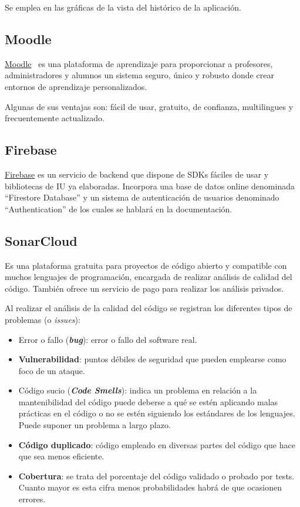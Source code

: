 Se emplea en las gráficas de la vista del histórico de la aplicación.

\subsection{Moodle}
\href{https://moodle.org/}{Moodle}~\cite{pagina_Moodle} es una plataforma de aprendizaje para proporcionar a profesores, administradores y alumnos un sistema seguro, único y robusto donde crear entornos de aprendizaje personalizados.

Algunas de sus ventajas son: fácil de usar, gratuito, de confianza, multilingues y frecuentemente actualizado.

\subsection{Firebase}
\href{https://firebase.google.com/}{Firebase} es un servicio de backend que dispone de SDKs fáciles de usar y bibliotecas de IU ya elaboradas. 
Incorpora una base de datos online denominada ``Firestore Database'' y un sistema de autenticación de usuarios denominado ``Authentication'' de los cuales se hablará en la documentación.

\subsection{SonarCloud}
Es una plataforma gratuita para proyectos de código abierto y compatible con muchos lenguajes de programación, encargada de realizar análisis de calidad del código. También ofrece un servicio de pago para realizar los análisis privados.

Al realizar el análisis de la calidad del código se registran los diferentes tipos de problemas (o \emph{issues}):
\begin{itemize}
	\tightlist
	\item Error o fallo (\textbf{\emph{bug}}): error o fallo del software real.   
	\item \textbf{Vulnerabilidad}: puntos débiles de seguridad que pueden emplearse como foco de un ataque.
	\item Código sucio (\textbf{\emph{Code Smells}}): indica un problema en relación a la mantenibilidad del código puede deberse a qué se estén aplicando malas prácticas en el código o no se estén siguiendo los estándares de los lenguajes. Puede suponer un problema a largo plazo.
	\item \textbf{Código duplicado}: código empleado en diversas partes del código que hace que sea menos eficiente.
	\item \textbf{Cobertura}: se trata del porcentaje del código validado o probado por tests. Cuanto mayor es esta cifra menos probabilidades habrá de que ocasionen errores.	
\end{itemize}

